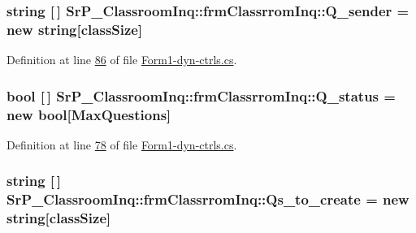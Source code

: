 \hypertarget{class_sr_p___classroom_inq_1_1frm_classrrom_inq_afa4b6c4601d48db676d4013daef6624c}{
\subsubsection[{\-Q\-\_\-sender}]{\setlength{\rightskip}{0pt plus 5cm}string \mbox{[}$\,$\mbox{]} {\bf \-Sr\-P\-\_\-\-Classroom\-Inq\-::frm\-Classrrom\-Inq\-::\-Q\-\_\-sender} = new string\mbox{[}{\bf class\-Size}\mbox{]}}}
\label{class_sr_p___classroom_inq_1_1frm_classrrom_inq_afa4b6c4601d48db676d4013daef6624c}


\-Definition at line \hyperlink{_form1-dyn-ctrls_8cs_source_l00086}{86} of file \hyperlink{_form1-dyn-ctrls_8cs_source}{\-Form1-\/dyn-\/ctrls.\-cs}.

\hypertarget{class_sr_p___classroom_inq_1_1frm_classrrom_inq_ae02a7c8f440963717ee0cf2f74d4d56a}{
\subsubsection[{\-Q\-\_\-status}]{\setlength{\rightskip}{0pt plus 5cm}bool \mbox{[}$\,$\mbox{]} {\bf \-Sr\-P\-\_\-\-Classroom\-Inq\-::frm\-Classrrom\-Inq\-::\-Q\-\_\-status} = new bool\mbox{[}{\bf \-Max\-Questions}\mbox{]}}}
\label{class_sr_p___classroom_inq_1_1frm_classrrom_inq_ae02a7c8f440963717ee0cf2f74d4d56a}


\-Definition at line \hyperlink{_form1-dyn-ctrls_8cs_source_l00078}{78} of file \hyperlink{_form1-dyn-ctrls_8cs_source}{\-Form1-\/dyn-\/ctrls.\-cs}.

\hypertarget{class_sr_p___classroom_inq_1_1frm_classrrom_inq_a04ea330233515e3af7d23fcd501364cc}{
\subsubsection[{\-Qs\-\_\-to\-\_\-create}]{\setlength{\rightskip}{0pt plus 5cm}string \mbox{[}$\,$\mbox{]} {\bf \-Sr\-P\-\_\-\-Classroom\-Inq\-::frm\-Classrrom\-Inq\-::\-Qs\-\_\-to\-\_\-create} = new string\mbox{[}{\bf class\-Size}\mbox{]}}}
\label{class_sr_p___classroom_inq_1_1frm_classrrom_inq_a04ea330233515e3af7d23fcd501364cc}


